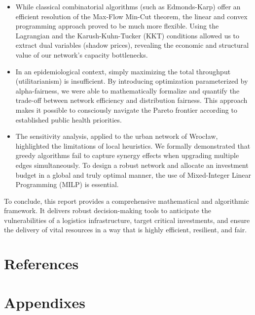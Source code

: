 \documentclass[12pt, openany]{article}
\begin{document}
\begin{itemize}
    \item While classical combinatorial algorithms (such as Edmonds-Karp) offer an efficient resolution of the Max-Flow Min-Cut theorem, the linear and convex programming approach proved to be much more flexible. Using the Lagrangian and the Karush-Kuhn-Tucker (KKT) conditions allowed us to extract dual variables (shadow prices), revealing the economic and structural value of our network's capacity bottlenecks.

    \item In an epidemiological context, simply maximizing the total throughput (utilitarianism) is insufficient. By introducing optimization parameterized by alpha-fairness, we were able to mathematically formalize and quantify the trade-off between network efficiency and distribution fairness. This approach makes it possible to consciously navigate the Pareto frontier according to established public health priorities.

    \item The sensitivity analysis, applied to the urban network of Wrocław, highlighted the limitations of local heuristics. We formally demonstrated that greedy algorithms fail to capture synergy effects when upgrading multiple edges simultaneously. To design a robust network and allocate an investment budget in a global and truly optimal manner, the use of Mixed-Integer Linear Programming (MILP) is essential.
\end{itemize}

To conclude, this report provides a comprehensive mathematical and algorithmic framework. It delivers robust decision-making tools to anticipate the vulnerabilities of a logistics infrastructure, target critical investments, and ensure the delivery of vital resources in a way that is highly efficient, resilient, and fair.

\section*{References}
\printbibliography[sorting=nyt, heading=none]

\newpage
{}
\section*{Appendixes}



\listoftables


\listoffigures


\listofalgorithms


\lstlistoflistings
\end{document}
